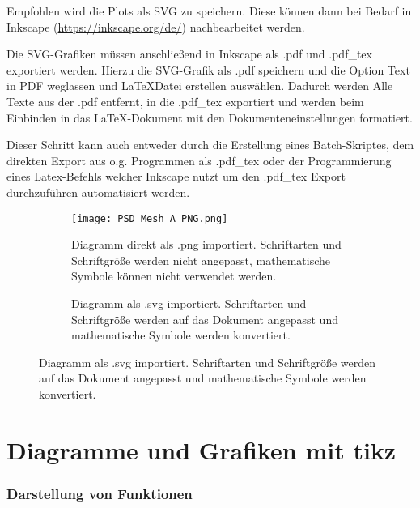Empfohlen wird die Plots als \gls{SVG} zu speichern. Diese können dann bei Bedarf in Inkscape (\url{https://inkscape.org/de/}) nachbearbeitet werden. 

Die \gls{SVG}-Grafiken müssen anschließend in Inkscape als .pdf und .pdf\_tex exportiert werden. Hierzu die \gls{SVG}-Grafik als .pdf speichern und die Option \flqq Text in PDF weglassen und \LaTeX Datei erstellen \frqq auswählen. Dadurch werden Alle Texte aus der .pdf entfernt, in die .pdf\_tex exportiert und werden beim Einbinden in das \LaTeX-Dokument mit den Dokumenteneinstellungen formatiert.

Dieser Schritt kann auch entweder durch die Erstellung eines Batch-Skriptes, dem direkten Export aus o.g. Programmen als .pdf\_tex oder der Programmierung eines Latex-Befehls welcher Inkscape nutzt um den .pdf\_tex Export durchzuführen automatisiert werden. \\

\begin{figure}[ht]
    \begin{footnotesize}
    	\centering
    	\begin{subfigure}[b]{0.45\textwidth}
    		\centering
    		\texttt{[image: PSD\_Mesh\_A\_PNG.png]}
    		\caption{%
    		    Diagramm direkt als .png importiert. Schriftarten und Schriftgröße werden nicht angepasst, mathematische Symbole können nicht verwendet werden.
    		}
    		\label{fig:png_import}
    	\end{subfigure}
    	\hspace{0.05\textwidth}
    	\begin{subfigure}[b]{0.45\textwidth}
    		\centering
    		
    		\caption{%
    		    Diagramm als .svg importiert. Schriftarten und Schriftgröße werden auf das Dokument angepasst und mathematische Symbole werden konvertiert.
    		}
    		\label{fig:svg_import}
    	\end{subfigure}
    \end{footnotesize}
\end{figure}

\newpage

\section{Diagramme und Grafiken mit tikz}
\label{subsec:tikz}

\subsubsection{Darstellung von Funktionen}

